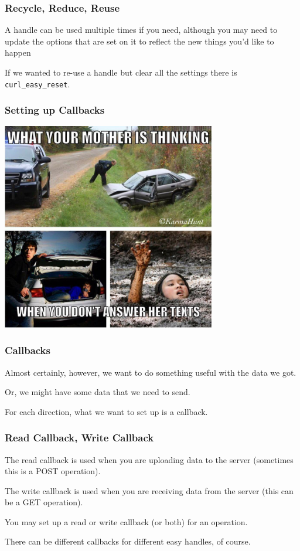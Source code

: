 \begin{frame}
\frametitle{Recycle, Reduce, Reuse}

A handle can be used multiple times if you need, although you may need to update the options that are set on it to reflect the new things you'd like to happen

If we wanted to re-use a handle but clear all the settings there is \texttt{curl\_easy\_reset}.

\end{frame}



\begin{frame}
\frametitle{Setting up Callbacks}

\begin{center}
	\includegraphics[width=0.7\textwidth]{images/callbacks.jpg}
\end{center}

\end{frame}



\begin{frame}
\frametitle{Callbacks}

Almost certainly, however, we want to do something useful with the data we got. 

Or, we might have some data that we need to send. 

For each direction, what we want to set up is a \alert{callback}. 


\end{frame}



\begin{frame}
\frametitle{Read Callback, Write Callback}

The read callback is used when you are uploading data to the server (sometimes this is a POST operation). 

The write callback is used when you are receiving data from the server (this can be a GET operation). 

You may set up a read or write callback (or both) for an operation. 

There can be different callbacks for different easy handles, of course.

\end{frame}



